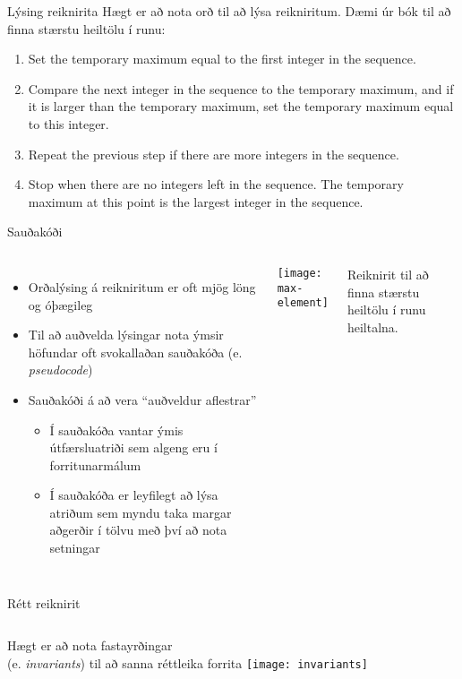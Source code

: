 \documentclass{beamer}
\begin{document}
\begin{frame}{Lýsing reiknirita}
Hægt er að nota orð til að lýsa reikniritum. Dæmi úr bók til að finna stærstu heiltölu í runu:

\begin{enumerate}
 \item Set the temporary maximum equal to the first integer in the sequence.
 \item Compare the next integer in the sequence to the temporary maximum, and if it is larger
than the temporary maximum, set the temporary maximum equal to this integer.
 \item Repeat the previous step if there are more integers in the sequence.
 \item Stop when there are no integers left in the sequence. The temporary maximum at this
point is the largest integer in the sequence.
\end{enumerate}
\end{frame}

\begin{frame}{Sauðakóði}
\begin{columns}
\begin{itemize}
 \item Orðalýsing á reikniritum er oft mjög löng og óþægileg
 \item Til að auðvelda lýsingar nota ýmsir höfundar oft svokallaðan sauðakóða (e. \emph{pseudocode})
 \item Sauðakóði á að vera ``auðveldur aflestrar''
 \begin{itemize}
  \item Í sauðakóða vantar ýmis útfærsluatriði sem algeng eru í forritunarmálum
  \item Í sauðakóða er leyfilegt að lýsa atriðum sem myndu taka margar aðgerðir í tölvu með því að nota setningar
 \end{itemize}
\end{itemize}
\texttt{[image: max-element]}

Reiknirit til að finna stærstu heiltölu í runu heiltalna.
\end{columns}
\end{frame}

\begin{frame}{Rétt reiknirit}
\begin{columns}
Hægt er að nota fastayrðingar\\
(e. \emph{invariants}) til að sanna réttleika forrita
\texttt{[image: invariants]}
\end{columns}
\end{frame}
\end{document}
